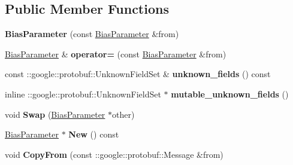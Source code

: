 \subsection*{Public Member Functions}
\begin{DoxyCompactItemize}
\item 
\mbox{\label{classcaffe_1_1_bias_parameter_a5b4867daac981eba3569149309faa602}} 
{\bfseries Bias\+Parameter} (const \mbox{\hyperlink{classcaffe_1_1_bias_parameter}{Bias\+Parameter}} \&from)
\item 
\mbox{\label{classcaffe_1_1_bias_parameter_a8e373dfbcb6e761d205f95fe319be59f}} 
\mbox{\hyperlink{classcaffe_1_1_bias_parameter}{Bias\+Parameter}} \& {\bfseries operator=} (const \mbox{\hyperlink{classcaffe_1_1_bias_parameter}{Bias\+Parameter}} \&from)
\item 
\mbox{\label{classcaffe_1_1_bias_parameter_a257f42aeffb3467c4fabbee7919dd001}} 
const \+::google\+::protobuf\+::\+Unknown\+Field\+Set \& {\bfseries unknown\+\_\+fields} () const
\item 
\mbox{\label{classcaffe_1_1_bias_parameter_a689873f6f07e5a658a796eb6e7b74c38}} 
inline \+::google\+::protobuf\+::\+Unknown\+Field\+Set $\ast$ {\bfseries mutable\+\_\+unknown\+\_\+fields} ()
\item 
\mbox{\label{classcaffe_1_1_bias_parameter_a0e47892a65aab68aaaa7657b087ca2d4}} 
void {\bfseries Swap} (\mbox{\hyperlink{classcaffe_1_1_bias_parameter}{Bias\+Parameter}} $\ast$other)
\item 
\mbox{\label{classcaffe_1_1_bias_parameter_a2501dcf80eb6f2429c28a7c6b2140c66}} 
\mbox{\hyperlink{classcaffe_1_1_bias_parameter}{Bias\+Parameter}} $\ast$ {\bfseries New} () const
\item 
\mbox{\label{classcaffe_1_1_bias_parameter_a4a0b95147e2656777dd50efb2cd91498}} 
void {\bfseries Copy\+From} (const \+::google\+::protobuf\+::\+Message \&from)
\item 
\mbox{\label{classcaffe_1_1_bias_parameter_afda8591a53c51b737ee0085952ccdd23}} 

\end{DoxyCompactItemize}
